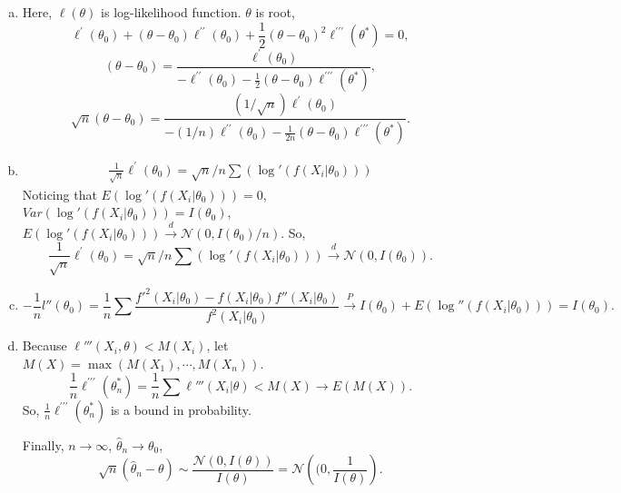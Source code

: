 \begin{solution}
    \begin{enumerate}[(a)]
        \item Here, $\ell(\theta)$ is log-likelihood function. $\theta$ is root, 
        \[
            \ell^{\prime}\left(\theta_{0}\right)+\left(\theta-\theta_{0}\right) \ell^{\prime \prime}\left(\theta_{0}\right)+\frac{1}{2}\left(\theta-\theta_{0}\right)^{2} \ell^{\prime \prime \prime}\left(\theta^{*}\right)=0, 
        \]
        \[
            \left(\theta-\theta_{0}\right)=\frac{\ell^{\prime}\left(\theta_{0}\right)}{-\ell^{\prime \prime}\left(\theta_{0}\right)-\frac{1}{2}\left(\theta-\theta_{0}\right) \ell^{\prime \prime \prime}\left(\theta^{*}\right)}, 
        \]
        \[
            \sqrt{n}\left(\theta-\theta_{0}\right)=\frac{(1/\sqrt{n})\ell^{\prime}\left(\theta_{0}\right)}{-(1/n)\ell^{\prime \prime}\left(\theta_{0}\right)-\frac{1}{2n}\left(\theta-\theta_{0}\right) \ell^{\prime \prime \prime}\left(\theta^{*}\right)}. 
        \]
        \item \begin{align*}
            \frac{1}{\sqrt{n}} \ell^{\prime}\left(\theta_{0}\right) =\sqrt{n}/n \sum\left(\log'(f(X_i|\theta_0))\right)
        \end{align*}
        Noticing that $E(\log'(f(X_i|\theta_0)))=0$, $Var(\log'(f(X_i|\theta_0)))=I(\theta_0)$, $E(\log'(f(X_i|\theta_0)))\stackrel{d}{\to}\mathcal{N}(0, I(\theta_0)/n)$. So, 
        \[
            \frac{1}{\sqrt{n}} \ell^{\prime}\left(\theta_{0}\right) =\sqrt{n}/n \sum\left(\log'(f(X_i|\theta_0))\right)\stackrel{d}{\to}\mathcal{N}(0, I(\theta_0)). 
        \]
        \item \[
            -\frac{1}{n}l''(\theta_0)=\frac{1}{n} \sum\frac{f'^2(X_i|\theta_0)-f(X_i|\theta_0)f''(X_i|\theta_0)}{f^2(X_i|\theta_0)}\stackrel{P}{\to}I(\theta_0)+E(\log''(f(X_i|\theta_0)))=I(\theta_0). 
        \]
        \item Because $\ell'''(X_i, \theta)<M(X_i)$,  let $M(X)=\max (M(X_1), \cdots, M(X_n))$. \[
            \frac{1}{n} \ell^{\prime \prime \prime}\left(\theta_{n}^{*}\right)=\frac{1}{n}\sum \ell'''(X_i|\theta)<M(X)\to E(M(X)). 
        \]
        So, $\frac{1}{n} \ell^{\prime \prime \prime}\left(\theta_{n}^{*}\right)$ is a bound in probability. 

        Finally, $n\to\infty$, $\widehat{\theta}_n\to\theta_0$, \[
            \sqrt{n}(\widehat{\theta}_n-\theta)\sim\frac{\mathcal{N}(0, I(\theta))}{I(\theta)}=\mathcal{N}\left((0, {\frac{1}{I(\theta)}}\right). 
        \]
    \end{enumerate}
\end{solution}


